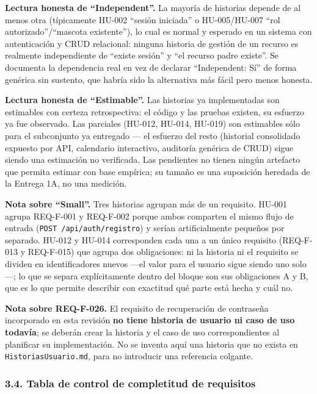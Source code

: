 \documentclass[
  spanish,
]{article}
\begin{document}
\textbf{Lectura honesta de ``Independent''.} La mayoría de historias
depende de al menos otra (típicamente HU-002 ``sesión iniciada'' o
HU-005/HU-007 ``rol autorizado''/``mascota existente''), lo cual es
normal y esperado en un sistema con autenticación y CRUD relacional:
ninguna historia de gestión de un recurso es realmente independiente de
``existe sesión'' y ``el recurso padre existe''. Se documenta la
dependencia real en vez de declarar ``Independent: Sí'' de forma
genérica sin sustento, que habría sido la alternativa más fácil pero
menos honesta.

\textbf{Lectura honesta de ``Estimable''.} Las historias ya
implementadas son estimables con certeza retrospectiva: el código y las
pruebas existen, su esfuerzo ya fue observado. Las parciales (HU-012,
HU-014, HU-019) son estimables sólo para el subconjunto ya entregado ---
el esfuerzo del resto (historial consolidado expuesto por API,
calendario interactivo, auditoría genérica de CRUD) sigue siendo una
estimación no verificada. Las pendientes no tienen ningún artefacto que
permita estimar con base empírica; su tamaño es una suposición heredada
de la Entrega 1A, no una medición.

\textbf{Nota sobre ``Small''.} Tres historias agrupan más de un
requisito. HU-001 agrupa REQ-F-001 y REQ-F-002 porque ambos comparten el
mismo flujo de entrada (\texttt{POST\ /\allowbreak{}api/\allowbreak{}auth/\allowbreak{}registro}) y serían
artificialmente pequeños por separado. HU-012 y HU-014 corresponden cada
una a un único requisito (REQ-F-013 y REQ-F-015) que agrupa dos
obligaciones: ni la historia ni el requisito se dividen en
identificadores nuevos ---el valor para el usuario sigue siendo uno
solo---; lo que se separa explícitamente dentro del bloque son sus
obligaciones A y B, que es lo que permite describir con exactitud qué
parte está hecha y cuál no.

\textbf{Nota sobre REQ-F-026.} El requisito de recuperación de
contraseña incorporado en esta revisión \textbf{no tiene historia de
usuario ni caso de uso todavía}; se deberán crear la historia y el caso
de uso correspondientes al planificar su implementación. No se inventa
aquí una historia que no exista en \texttt{Historias\allowbreak{}Usuario.\allowbreak{}md}, para no
introducir una referencia colgante.

\subsubsection{3.4. Tabla de control de completitud de
requisitos}\label{tabla-de-control-de-completitud-de-requisitos}
\end{document}
